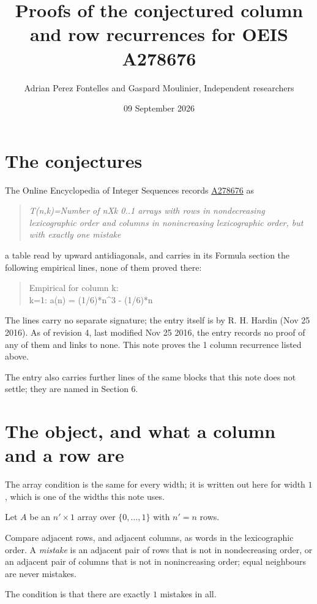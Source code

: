 \documentclass[11pt]{article}
\title{Proofs of the conjectured column and row recurrences for OEIS A278676}
\author{Adrian Perez Fontelles and Gaspard Moulinier, Independent researchers}
\date{09 September 2026}
\theoremstyle{definition}
\begin{document}
\maketitle
\section{The conjectures}

The Online Encyclopedia of Integer Sequences records \href{https://oeis.org/A278676}{A278676} as

\begin{quote}\itshape T(n,k)=Number of nXk 0..1 arrays with rows in nondecreasing lexicographic order and columns in nonincreasing lexicographic order, but with exactly one mistake\end{quote}

a table read by upward antidiagonals, and carries in its Formula section the following empirical lines, none of them proved there:

\begin{quote}\ttfamily Empirical for column k:\\
k=1: a(n) = (1/6)*n\textasciicircum{}3 - (1/6)*n\end{quote}

The lines carry no separate signature; the entry itself is by R. H. Hardin (Nov 25 2016). As of revision 4, last modified Nov 25 2016, the entry records no proof of any of them and links to none. This note proves the 1 column recurrence listed above.

The entry also carries further lines of the same blocks that this note does not settle; they are named in Section 6.

\section{The object, and what a column and a row are}

The array condition is the same for every width; it is written out here for width $1$, which is one of the widths this note uses.

Let $A$ be an $n' \times 1$ array over $\{0,\dots,1\}$ with $n' = n$ rows.

Compare adjacent rows, and adjacent columns, as words in the lexicographic order. A {\itshape mistake} is an adjacent pair of rows that is not in nondecreasing order, or an adjacent pair of columns that is not in nonincreasing order; equal neighbours are never mistakes.

The condition is that there are exactly $1$ mistakes in all.
\end{document}
